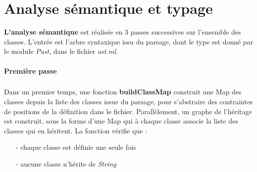 \documentclass{article}
\begin{document}
\section{Analyse sémantique et typage}

\textbf{L'analyse sémantique} est réalisée en 3 passes successives sur l'ensemble des classes. L'entrée est l'arbre syntaxique issu du parsage, dont le type est donné par le module \emph{Past}, dans le fichier \emph{ast.ml}.

\paragraph{Première passe}
\subparagraph*{}
 Dans un premier temps, une fonction \textbf{buildClassMap} construit une Map des classes depuis la liste des classes issue du parsage, pour s'abstraire des contraintes de positions de la définition dans le fichier. Parallèlement, un graphe de l'héritage est construit, sous la forme d'une Map qui à chaque classe associe la liste des classes qui en héritent. La fonction vérifie que :
 \begin{itemize} 
   \item[-] chaque classe est définie une seule fois
   \item[-] aucune classe n'hérite de \emph{String}
\end{itemize}
\end{document}
